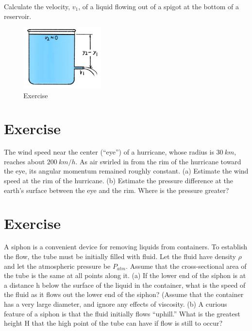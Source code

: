 \documentclass[12pt]{article}
\begin{document}
Calculate the velocity, $v_1$, of a liquid flowing out of a spigot at the bottom of a reservoir.



\vspace{5mm}


\begin{figure}[h!]
  \begin{center}
    \includegraphics[height=1.3in]{images/Bernoulli2.jpg}
    \caption{Exercise \theexample }
    \label{2}
  \end{center}
\end{figure}


\section*{Exercise \theexample}

The wind speed near the center (“eye”) of a hurricane,
  whose radius is  $30~km$, reaches about $200~km/h$. As air
  swirled in from the rim of the hurricane toward the eye, its angular
  momentum remained roughly constant. (a) Estimate the wind
speed at the rim of the hurricane. (b) Estimate the pressure difference
at the earth’s surface between the eye and the rim.  
Where is the pressure greater? 



\section*{Exercise \theexample}


A siphon is a convenient
device for removing liquids from containers. To establish the flow,
the tube must be initially filled with fluid. Let the fluid have density $\rho$
and let the atmospheric pressure be $P_{atm}$. Assume that the
cross-sectional area of the tube is the same at all points along it.
(a) If the lower end of the siphon is at a distance h below the surface
  of the liquid in the container, what is the speed of the fluid as it
  flows out the lower end of the siphon? (Assume that the container
  has a very large diameter, and ignore any effects of viscosity.
(b) A curious feature of a siphon is that the fluid initially flows
  “uphill.” What is the greatest height H that the high point of the
  tube can have if flow is still to occur?
\end{document}
